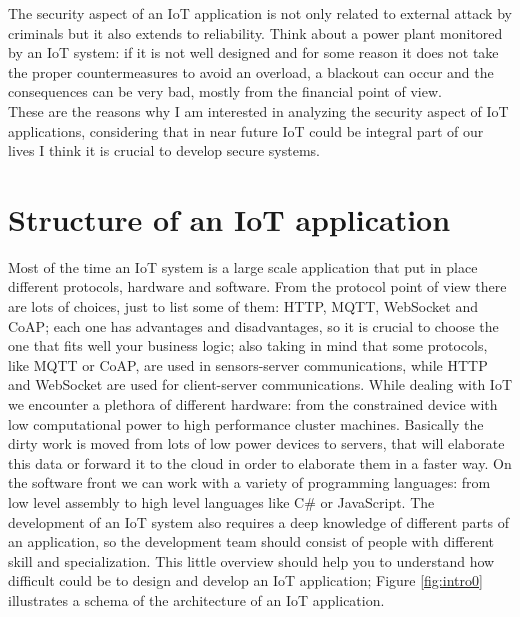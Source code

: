 	The security aspect of an IoT application is not only related to external attack by criminals but it also extends to reliability. Think about a power plant monitored by
	an IoT system: if it is not well designed and for some reason it does not take the proper countermeasures to avoid an overload, a blackout can occur and the consequences can be very bad, mostly from the financial point of view.\\
	These are the reasons why I am interested in analyzing the security aspect of IoT applications, considering that in near future
	IoT could be integral part of our lives I think it is crucial to develop secure systems.
	
	
	\section{Structure of an IoT application}
	Most of the time an IoT system is a large scale application that put in place different protocols, hardware and software.\newline
	From the protocol point of view there are lots of choices, just to list some of them: HTTP, MQTT, WebSocket and CoAP;
	each one has advantages and disadvantages, so it is crucial to choose the one that fits well your business logic; also taking in mind
	that some protocols, like MQTT or CoAP, are used in sensors-server communications, while HTTP and WebSocket
	are used for client-server communications.\newline
	While dealing with IoT we encounter a plethora of different hardware: from the constrained device with low computational power to
	high performance cluster machines. Basically the dirty work is moved from lots of low power devices to servers,
	that will elaborate this data or forward it to the cloud in order to elaborate them in a faster way.\newline
	On the software front we can work with a variety of programming languages: from low level assembly to high level languages like C\# or JavaScript.\newline
	The development of an IoT system also requires a deep knowledge of different parts of an application, so the development team
	should consist of people with different skill and specialization.\newline
	This little overview should help you to understand how difficult could be to design and develop an IoT application; Figure \ref{fig:intro0} illustrates a schema of the architecture of an IoT application.\newline
	
